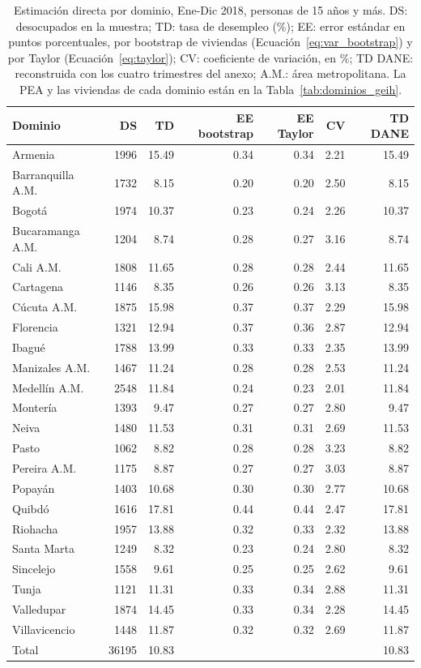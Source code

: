 \begin{table}[!htbp]
\centering
\small
\caption{Estimación directa por dominio, Ene-Dic 2018, personas de 15 años y más. DS: desocupados en la muestra; TD: tasa de desempleo (\%); EE: error estándar en puntos porcentuales, por bootstrap de viviendas (Ecuación~\ref{eq:var_bootstrap}) y por Taylor (Ecuación~\ref{eq:taylor}); CV: coeficiente de variación, en \%; TD DANE: reconstruida con los cuatro trimestres del anexo; A.M.: área metropolitana. La PEA y las viviendas de cada dominio están en la Tabla~\ref{tab:dominios_geih}.}
\label{tab:res_directa}
\begin{tabular}{l r r r r r r}
\toprule
Dominio & DS & TD & EE bootstrap & EE Taylor & CV & TD DANE \\
\midrule
Armenia & \num{1996} & 15.49 & 0.34 & 0.34 & 2.21 & 15.49 \\
Barranquilla A.M. & \num{1732} & 8.15 & 0.20 & 0.20 & 2.50 & 8.15 \\
Bogotá & \num{1974} & 10.37 & 0.23 & 0.24 & 2.26 & 10.37 \\
Bucaramanga A.M. & \num{1204} & 8.74 & 0.28 & 0.27 & 3.16 & 8.74 \\
Cali A.M. & \num{1808} & 11.65 & 0.28 & 0.28 & 2.44 & 11.65 \\
Cartagena & \num{1146} & 8.35 & 0.26 & 0.26 & 3.13 & 8.35 \\
Cúcuta A.M. & \num{1875} & 15.98 & 0.37 & 0.37 & 2.29 & 15.98 \\
Florencia & \num{1321} & 12.94 & 0.37 & 0.36 & 2.87 & 12.94 \\
Ibagué & \num{1788} & 13.99 & 0.33 & 0.33 & 2.35 & 13.99 \\
Manizales A.M. & \num{1467} & 11.24 & 0.28 & 0.28 & 2.53 & 11.24 \\
Medellín A.M. & \num{2548} & 11.84 & 0.24 & 0.23 & 2.01 & 11.84 \\
Montería & \num{1393} & 9.47 & 0.27 & 0.27 & 2.80 & 9.47 \\
Neiva & \num{1480} & 11.53 & 0.31 & 0.31 & 2.69 & 11.53 \\
Pasto & \num{1062} & 8.82 & 0.28 & 0.28 & 3.23 & 8.82 \\
Pereira A.M. & \num{1175} & 8.87 & 0.27 & 0.27 & 3.03 & 8.87 \\
Popayán & \num{1403} & 10.68 & 0.30 & 0.30 & 2.77 & 10.68 \\
Quibdó & \num{1616} & 17.81 & 0.44 & 0.44 & 2.47 & 17.81 \\
Riohacha & \num{1957} & 13.88 & 0.32 & 0.33 & 2.32 & 13.88 \\
Santa Marta & \num{1249} & 8.32 & 0.23 & 0.24 & 2.80 & 8.32 \\
Sincelejo & \num{1558} & 9.61 & 0.25 & 0.25 & 2.62 & 9.61 \\
Tunja & \num{1121} & 11.31 & 0.33 & 0.34 & 2.88 & 11.31 \\
Valledupar & \num{1874} & 14.45 & 0.33 & 0.34 & 2.28 & 14.45 \\
Villavicencio & \num{1448} & 11.87 & 0.32 & 0.32 & 2.69 & 11.87 \\
\midrule
Total & \num{36195} & 10.83 & & & & 10.83 \\
\bottomrule
\end{tabular}
\end{table}
